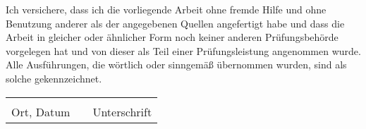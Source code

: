 Ich versichere, dass ich die vorliegende Arbeit ohne fremde Hilfe und ohne Benutzung 
anderer als der angegebenen Quellen angefertigt habe und dass die Arbeit in gleicher 
oder ähnlicher Form noch keiner anderen Prüfungsbehörde vorgelegen hat und von dieser 
als Teil einer Prüfungsleistung angenommen wurde. Alle Ausführungen, die wörtlich oder 
sinngemäß übernommen wurden, sind als solche gekennzeichnet.\\

\begin{table}[!htb]
\centering
\begin{tabularx}{\textwidth}{lXl}

       \hspace{6cm} &  & \hspace{6cm} \\
\cline{1-1}\cline{3-3}
Ort, Datum  &  & Unterschrift
\end{tabularx}
\end{table}